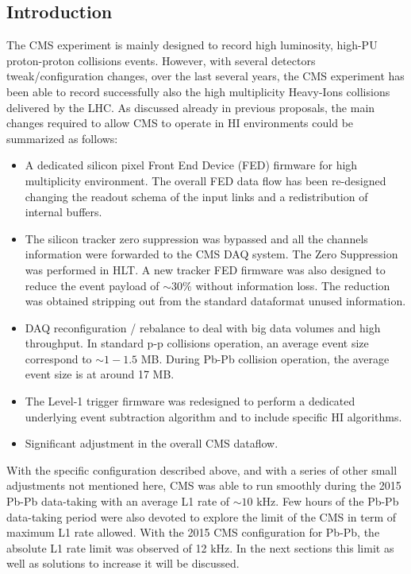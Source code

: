 \subsection{Introduction\label{subsec:HWintro}}
The CMS experiment is mainly designed to record high luminosity, high-PU proton-proton collisions events.  However, with several detectors tweak/configuration changes, over the last several years, the CMS experiment has been able to record successfully also the high multiplicity Heavy-Ions collisions delivered by the LHC. As discussed already in previous
proposals, the main changes required to allow CMS to operate in HI environments could be summarized as follows:

\begin{itemize}
\item A dedicated silicon pixel Front End Device (FED) firmware for high multiplicity environment. The overall FED data flow has been re-designed changing the readout schema of the input links and a redistribution of internal buffers.
 
\item The silicon tracker zero suppression was bypassed and all the channels information were forwarded to the CMS DAQ system. The Zero Suppression was performed in HLT. A new tracker FED firmware was also designed to reduce the event payload of $\sim 30 \%$ without information loss. The reduction was obtained stripping out from the standard dataformat unused information.  

\item DAQ reconfiguration / rebalance to deal with big data volumes and high throughput. In standard p-p collisions operation, an average event size correspond to $\sim 1-1.5$ MB. During Pb-Pb collision operation, the average event size is at around 17 MB. 

\item The Level-1 trigger firmware was redesigned to perform a dedicated underlying event subtraction algorithm and to include specific HI algorithms.

\item Significant adjustment in the overall CMS dataflow.
\end{itemize}


With the specific configuration described above, and with a series of other small adjustments not mentioned here, CMS was able to run smoothly during the 2015 Pb-Pb data-taking with an average L1 rate of $\sim 10$ kHz. Few hours of the Pb-Pb data-taking
period were also devoted to explore the limit of the CMS in term of maximum L1 rate allowed.  With the 2015 CMS configuration for Pb-Pb, the absolute L1 rate limit was observed of 12 kHz. In the next sections this limit as well as solutions to increase it will be discussed. 

